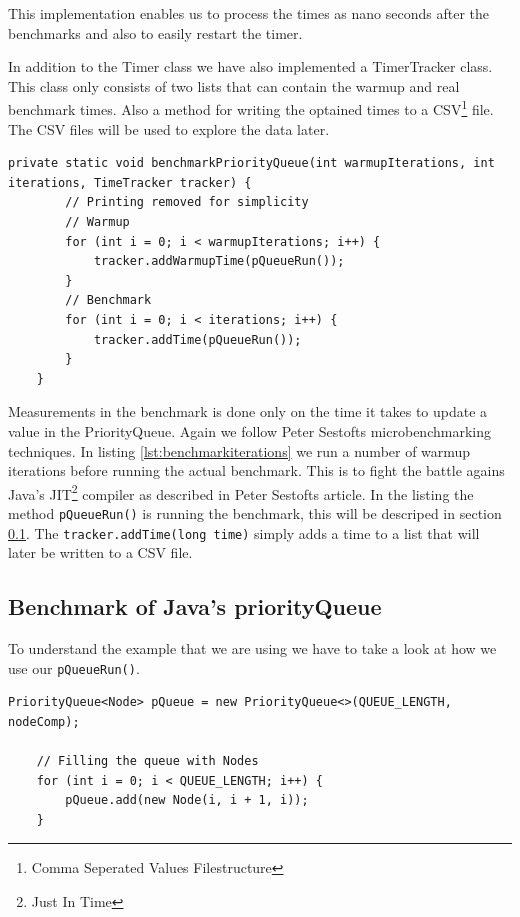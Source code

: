 \documentclass{article}
\begin{document}
This implementation enables us to process the times as nano seconds after 
the benchmarks and also to easily restart the timer.

In addition to the Timer class we have also implemented a TimerTracker class.
This class only consists of two lists that can contain the warmup and real 
benchmark times. Also a method for writing the optained times to a CSV\footnote{Comma Seperated Values Filestructure} file.
The CSV files will be used to explore the data later. 

\begin{lstlisting}[caption={Benchmark iterations}, label={lst:benchmarkiterations}]
    private static void benchmarkPriorityQueue(int warmupIterations, int iterations, TimeTracker tracker) {
        // Printing removed for simplicity
        // Warmup
        for (int i = 0; i < warmupIterations; i++) {
            tracker.addWarmupTime(pQueueRun());
        }
        // Benchmark
        for (int i = 0; i < iterations; i++) {
            tracker.addTime(pQueueRun());
        }
    }
\end{lstlisting}

Measurements in the benchmark is done only on the time it takes to update 
a value in the PriorityQueue. Again we follow Peter Sestofts microbenchmarking 
techniques. In listing \ref{lst:benchmarkiterations} we run a number of warmup iterations before running the
actual benchmark. This is to fight the battle agains Java's JIT\footnote{Just In Time} 
compiler as described in Peter Sestofts article. In the listing the method 
\lstinline{pQueueRun()} is running the benchmark, this will be descriped 
in section \ref{sec:javabenchmark}. The \lstinline{tracker.addTime(long time)} 
simply adds a time to a list that will later be written to a CSV file.

\subsection{Benchmark of Java's priorityQueue} %
\label{sec:javabenchmark}
To understand the example that we are using we have to take a look at how we use our \lstinline{pQueueRun()}.

\begin{lstlisting}[caption={Populating the queue},label={lst:Populating_the_queue}]
    PriorityQueue<Node> pQueue = new PriorityQueue<>(QUEUE_LENGTH, nodeComp);

    // Filling the queue with Nodes
    for (int i = 0; i < QUEUE_LENGTH; i++) {
        pQueue.add(new Node(i, i + 1, i));
    }
\end{lstlisting}
\end{document}
